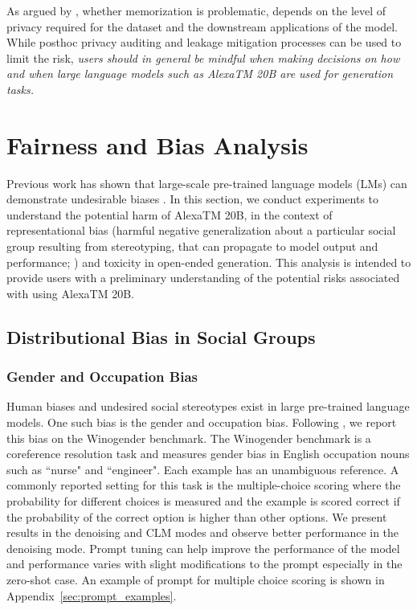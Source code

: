 As argued by \citep{Chowdhery2022PaLMSL}, whether memorization is problematic, depends on the level of privacy required for the dataset and the downstream applications of the model. While posthoc privacy auditing \citep{Jagielski2020AuditingDP, Jayaraman2019Eval, Nasr2021AdversaryIL} and leakage mitigation processes \citep{Majmudar2022DifferentiallyPD} can be used to limit the risk, \emph{users should in general be mindful when making decisions on how and when large language models such as {AlexaTM 20B} are used for generation tasks.}

\section{Fairness and Bias Analysis}
\label{sec:fairness_analysis}

Previous work has shown that large-scale pre-trained language models (LMs) can demonstrate undesirable biases \citep{sheng-etal-2021-societal, osti_10098355, dev_measuring_2020, Liang2021TowardsUA, 10.1145/3531146.3533088}. In this section, we conduct experiments to understand the potential harm of {AlexaTM 20B}, in the context of representational bias (harmful negative generalization about a particular social group resulting from stereotyping, that can propagate to model output and performance; \citealt{blodgett-etal-2020-language}) and toxicity in open-ended generation. This analysis is intended to provide users with a preliminary understanding of the potential risks associated with using {AlexaTM 20B}.

\subsection{Distributional Bias in Social Groups}

\subsubsection{Gender and Occupation Bias} Human biases and undesired social stereotypes exist in large pre-trained language models. One such bias is the gender and occupation bias. Following \citep{Chowdhery2022PaLMSL}, we report this bias on the Winogender benchmark. The Winogender benchmark is a coreference resolution task and measures gender bias in English occupation nouns such as ``nurse" and ``engineer". Each example has an unambiguous reference. A commonly reported setting for this task is the multiple-choice scoring where the probability for different choices is measured and the example is scored correct if the probability of the correct option is higher than other options. We present results in the denoising and CLM modes and observe better performance in the denoising mode. Prompt tuning can help improve the performance of the model and performance varies with slight modifications to the prompt especially in the zero-shot case. An example of prompt for multiple choice scoring is shown in Appendix~\ref{sec:prompt_examples}. 

